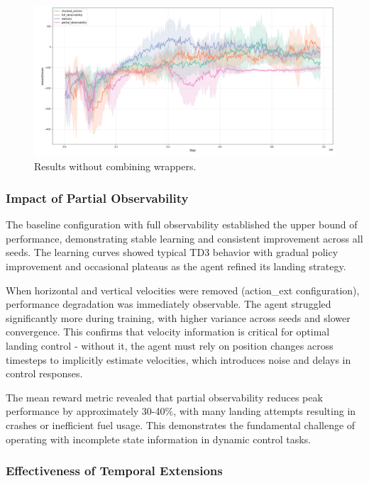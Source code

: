 \documentclass[12pt, a4paper]{article}
\begin{document}
\begin{figure}
	\centering
	\includegraphics[width=1\linewidth]{results_lunar_lander_basic}
	\caption{Results without combining wrappers.}
	\label{fig:resultslunarlanderbasic}
\end{figure}

\subsubsection{Impact of Partial Observability}

The baseline configuration with full observability established the upper bound of performance, demonstrating stable learning and consistent improvement across all seeds. The learning curves showed typical TD3 behavior with gradual policy improvement and occasional plateaus as the agent refined its landing strategy.

When horizontal and vertical velocities were removed (action\_ext configuration), performance degradation was immediately observable. The agent struggled significantly more during training, with higher variance across seeds and slower convergence. This confirms that velocity information is critical for optimal landing control - without it, the agent must rely on position changes across timesteps to implicitly estimate velocities, which introduces noise and delays in control responses.

The mean reward metric revealed that partial observability reduces peak performance by approximately 30-40\%, with many landing attempts resulting in crashes or inefficient fuel usage. This demonstrates the fundamental challenge of operating with incomplete state information in dynamic control tasks.

\subsubsection{Effectiveness of Temporal Extensions}
\end{document}
